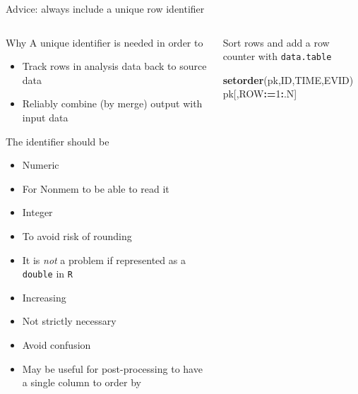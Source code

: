 \documentclass[
  8pt,
  ignorenonframetext,
  aspectratio=169]{beamer}
\newenvironment{Shaded}{\begin{snugshade}}{\end{snugshade}}
\newcommand{\DecValTok}[1]{\textcolor[rgb]{0.00,0.00,0.81}{#1}}
\newcommand{\ErrorTok}[1]{\textcolor[rgb]{0.64,0.00,0.00}{\textbf{#1}}}
\newcommand{\KeywordTok}[1]{\textcolor[rgb]{0.13,0.29,0.53}{\textbf{#1}}}
\newcommand{\NormalTok}[1]{#1}
\newcommand{\OperatorTok}[1]{\textcolor[rgb]{0.81,0.36,0.00}{\textbf{#1}}}
\begin{document}
\begin{frame}[fragile]{Advice: always include a unique row identifier}
\protect\hypertarget{advice-always-include-a-unique-row-identifier}{}
\begin{columns}[T]
\begin{column}{0.48\textwidth}
\begin{block}{Why}
\protect\hypertarget{why}{}
A unique identifier is needed in order to

\begin{itemize}
\item
  Track rows in analysis data back to source data
\item
  Reliably combine (by merge) output with input data
\end{itemize}
\end{block}

\begin{block}{The identifier should be}
\protect\hypertarget{the-identifier-should-be}{}
\begin{itemize}
\item
  Numeric
\item
  For Nonmem to be able to read it
\item
  Integer
\item
  To avoid risk of rounding
\item
  It is \emph{not} a problem if represented as a \texttt{double} in
  \texttt{R}
\item
  Increasing
\item
  Not strictly necessary
\item
  Avoid confusion
\item
  May be useful for post-processing to have a single column to order by
\end{itemize}
\end{block}
\end{column}

\begin{column}{0.48\textwidth}
\begin{block}{Sort rows and add a row counter with \texttt{data.table}}
\protect\hypertarget{sort-rows-and-add-a-row-counter-with-data.table}{}
\begin{Shaded}
\begin{Highlighting}[]
\KeywordTok{setorder}\NormalTok{(pk,ID,TIME,EVID)}
\NormalTok{pk[,ROW}\OperatorTok{:}\ErrorTok{=}\DecValTok{1}\OperatorTok{:}\NormalTok{.N]}
\end{Highlighting}
\end{Shaded}
\end{block}
\end{column}
\end{columns}
\end{frame}
\end{document}
